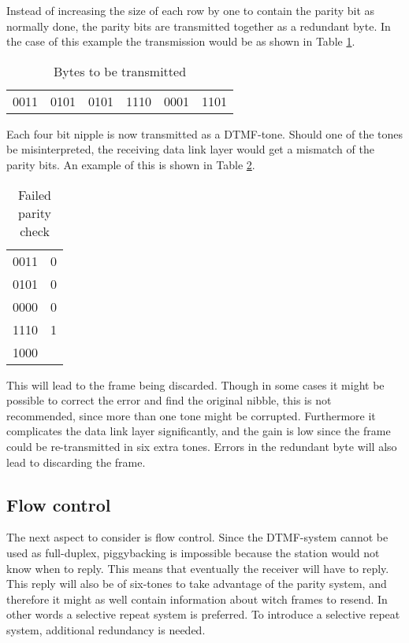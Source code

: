 Instead of increasing the size of each row by one to contain the parity bit as normally done, the parity bits are transmitted together as a redundant byte. In the case of this example the transmission would be as shown in Table \ref{tab:bytes_to_be_transmitted}.

\begin{table}[htb]
	\centering
	\begin{tabular}{c|c|c|c|c|c}
	0011 & 0101 & 0101 & 1110 & 0001 & 1101 \\
	\end{tabular}
	\caption{Bytes to be transmitted}
	\label{tab:bytes_to_be_transmitted}
\end{table}

Each four bit nipple is now transmitted as a DTMF-tone. Should one of the tones
be misinterpreted, the receiving data link layer would get a mismatch of the
parity bits. An example of this is shown in Table \ref{tab:failed_parity_check}.

\begin{table}[htb]
	\centering
	\begin{tabular}{c|c}
	0011 & 0 \\
	0101 & 0 \\
	0000 & 0 \\
	1110 & 1 \\
	\hline
	1000 & \\
	\end{tabular}
	\caption{Failed parity check}
	\label{tab:failed_parity_check}
\end{table}

This will lead to the frame being discarded. Though in some cases it might be
possible to correct the error and find the original nibble, this is not
recommended, since more than one tone might be corrupted. Furthermore it
complicates the data link layer significantly, and the gain is low since the
frame could be re-transmitted in six extra tones. Errors in the redundant byte
will also lead to discarding the frame.

\subsection{Flow control}
The next aspect to consider is flow control. Since the DTMF-system
cannot be used as full-duplex, piggybacking \cite[339]{KOM} is impossible
because the station would not know when to reply. This means that eventually the
receiver will have to reply. This reply will also be of six-tones to take advantage of the parity system, and therefore it might
as well contain information about witch frames to resend. In other words a
selective repeat system is preferred. To introduce a selective repeat system,
additional redundancy is needed.

